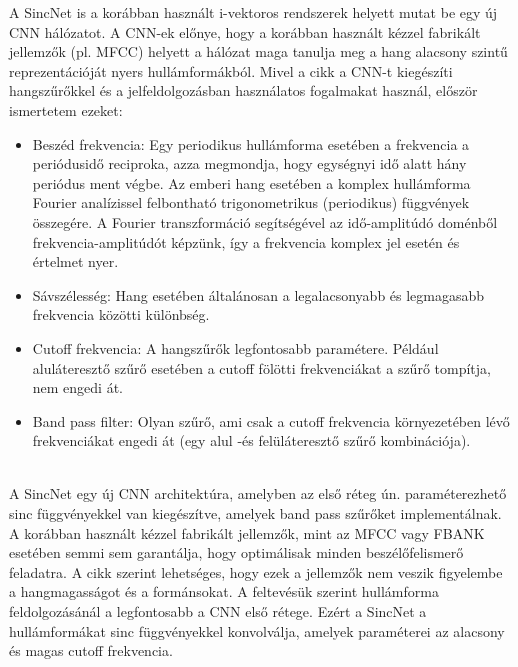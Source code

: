A SincNet is a korábban használt i-vektoros rendszerek helyett mutat be egy új CNN hálózatot. A CNN-ek előnye, hogy a korábban használt kézzel fabrikált jellemzők (pl. MFCC) helyett a hálózat maga tanulja meg a hang alacsony szintű reprezentációját nyers hullámformákból. Mivel a cikk a CNN-t kiegészíti hangszűrőkkel és a jelfeldolgozásban használatos fogalmakat használ, először ismertetem ezeket:
\begin{itemize}
	\item Beszéd frekvencia: Egy periodikus hullámforma esetében a frekvencia a periódusidő reciproka, azza megmondja, hogy egységnyi idő alatt hány periódus ment végbe. Az emberi hang esetében a komplex hullámforma Fourier analízissel felbontható trigonometrikus (periodikus) függvények összegére. A Fourier transzformáció segítségével az idő-amplitúdó doménből frekvencia-amplitúdót képzünk, így a frekvencia komplex jel esetén és értelmet nyer.
	\item Sávszélesség: Hang esetében általánosan a legalacsonyabb és legmagasabb frekvencia közötti különbség.
	\item Cutoff frekvencia: A hangszűrők legfontosabb paramétere. Például aluláteresztő szűrő esetében a cutoff fölötti frekvenciákat a szűrő tompítja, nem engedi át.
	\item Band pass filter: Olyan szűrő, ami csak a cutoff frekvencia környezetében lévő frekvenciákat engedi át (egy alul -és felüláteresztő szűrő kombinációja).
\end{itemize} 
\ \\
\newline
\newline
A SincNet egy új CNN architektúra, amelyben az első réteg ún. paraméterezhető sinc függvényekkel van kiegészítve, amelyek band pass szűrőket implementálnak.
\newline
\newline
A korábban használt kézzel fabrikált jellemzők, mint az MFCC vagy FBANK esetében semmi sem garantálja, hogy optimálisak minden beszélőfelismerő feladatra. A cikk szerint lehetséges, hogy ezek a jellemzők nem veszik figyelembe a hangmagasságot és a formánsokat. A feltevésük szerint hullámforma feldolgozásánál a legfontosabb a CNN első rétege. Ezért a SincNet a hullámformákat sinc függvényekkel konvolválja, amelyek paraméterei az alacsony és magas cutoff frekvencia.

